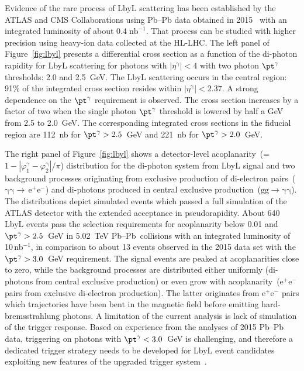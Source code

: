 Evidence of the rare process of LbyL scattering has been established by the ATLAS and CMS Collaborations using Pb--Pb data obtained in 2015~\cite{Aaboud:2017bwk,Sirunyan:2018fhl} with an integrated luminosity of about $0.4\;\mathrm{nb}^{-1}$. That process can be studied with higher precision using heavy-ion data collected at the HL-LHC. The left panel of Figure~\ref{fig:lbyl} presents a differential cross section as a function of the di-photon rapidity for LbyL scattering for photons with $|\eta^{\mathrm{\gamma}}|<4$ with two photon $\pt^{\mathrm{\gamma}}$ thresholds: 2.0 and 2.5~GeV. The LbyL scattering occurs in the central region: 91\% of the integrated cross section resides within $|\eta^{\mathrm{\gamma}}|<2.37$. A strong dependence on the $\pt^{\mathrm{\gamma}}$ requirement is observed. The cross section increases by a factor of two when the single photon $\pt^{\mathrm{\gamma}}$ threshold is lowered by half a GeV from 2.5 to 2.0~GeV. The corresponding integrated cross sections in the fiducial region are 112~nb for $\pt^{\mathrm{\gamma}}>2.5$~GeV and 221~nb for $\pt^{\mathrm{\gamma}}>2.0$~GeV. 

The right panel of Figure~\ref{fig:lbyl} shows a detector-level acoplanarity~(=$1-|\varphi^{\mathrm{\gamma}}_1-\varphi^{\mathrm{\gamma}}_2|/\pi$) distribution for the di-photon system from LbyL signal and two background processes originating from exclusive production of di-electron pairs~($\mathrm{\gamma\gamma\rightarrow\,e^+e^-}$) and di-photons produced in central exclusive production~($\mathrm{gg\rightarrow \gamma\gamma}$). The distributions depict simulated events which passed a full simulation of the ATLAS detector with the extended acceptance in pseudorapidity. About 640 LbyL events pass the selection requirements for acoplanarity below 0.01 and $\pt^{\mathrm{\gamma}}>2.5$~GeV in 5.02~TeV Pb--Pb~collisions with an integrated luminosity of 10\,nb$^{-1}$, in comparison to about 13 events observed in the 2015 data set with the $\pt^{\mathrm{\gamma}}>3.0$~GeV requirement. 
The signal events are peaked at acoplanarities close to zero, while the background processes are distributed either uniformly (di-photons from central exclusive production) or even grow with acoplanarity~($\mathrm{e^+e^-}$ pairs from exclusive di-electron production). The latter originates from $\mathrm{e^+e^-}$ pairs which trajectories have been bent in the magnetic field before emitting hard-bremsstrahlung photons.
A limitation of the current analysis is lack of simulation of the trigger response. Based on experience from the analyses of 2015 Pb--Pb data, triggering on photons with $\pt^{\mathrm{\gamma}}<3.0$~GeV is challenging, and therefore a dedicated trigger strategy needs to be developed for LbyL event candidates exploiting new features of the upgraded trigger system~\cite{Aad:2013tqj,Tapper:1556311}.

